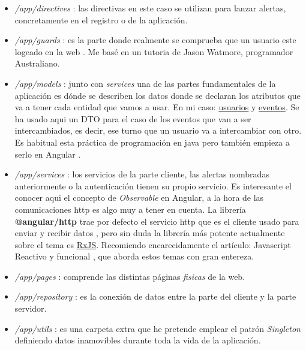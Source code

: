\begin{itemize}

	\item \emph{/app/directives} : las directivas  en este caso se utilizan para lanzar alertas, concretamente en el registro o  de la aplicación. 
	
	\item \emph{/app/guards} : es la parte donde realmente se comprueba que un usuario este logeado en la web \cite{guards}. Me basé en un tutoria \cite{logintut} de Jason Watmore, programador Australiano. 
	
	\item \emph{/app/models} : junto con \emph{services} una de las partes fundamentales de la aplicación es dónde se describen los datos donde se declaran los atributos que va a tener cada entidad que vamos a usar. En mi caso: \underline{usuarios} y \underline{eventos}.  
	Se ha usado aqui un DTO \cite{dto} para el caso de los eventos que van a ser intercambiados, es decir, ese turno que un usuario va a intercambiar con otro. Es habitual esta práctica de programación en java pero también empieza a serlo en Angular \cite{dto2}.
	
	\item \emph{/app/services} : los servicios de la parte cliente, las alertas nombradas anteriormente o la autenticación tienen su propio servicio. Es interesante el conocer aqui el concepto de \emph{Observable} \cite{ob1} en Angular, a la hora de las comunicaciones http es algo muy a tener en cuenta. La librería \textbf{@angular/http} trae por defecto el servicio http que es el cliente usado para enviar y recibir datos \cite{ob2}, pero sin duda la librería más potente actualmente sobre el tema es \href{http://reactivex.io/rxjs/}{RxJS}. Recomiendo encarecidamente el artículo: Javascript Reactivo y funcional \cite{ob3}, que aborda estos temas con gran entereza.
	
	\item \emph{/app/pages} : comprende las distintas páginas \emph{fisicas} de la web.
	
	\item \emph{/app/repository} : es la conexión de datos entre la parte del cliente y la parte servidor.
	
	\item \emph{/app/utils} : es una carpeta extra que he pretende emplear el patrón \emph{Singleton} definiendo datos inamovibles durante toda la vida de la aplicación.
	

\end{itemize}

